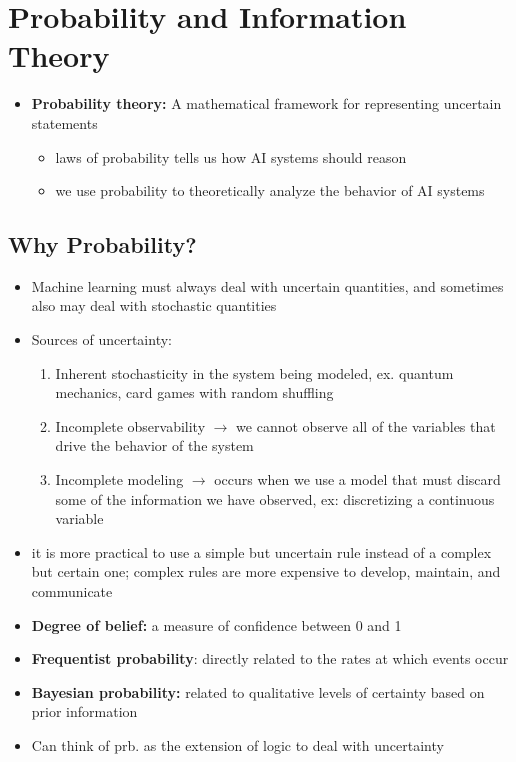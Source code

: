 \section{Probability and Information Theory}
\begin{itemize}
    \item \textbf{Probability theory:} A mathematical framework for representing uncertain statements
    \begin{itemize}
        \item laws of probability tells us how AI systems should reason
        \item we use probability to theoretically analyze the behavior of AI systems 
    \end{itemize}
\end{itemize}
\subsection{Why Probability?}
\begin{itemize}
    \item Machine learning must always deal with uncertain quantities, and sometimes also may deal with stochastic quantities
    \item Sources of uncertainty:
    \begin{enumerate}
        \item Inherent stochasticity in the system being modeled, ex. quantum mechanics, card games with random shuffling
        \item Incomplete observability $\rightarrow$ we cannot observe all of the variables that drive the behavior of the system 
        \item Incomplete modeling $\rightarrow$ occurs when we use a model that must discard some of the information we have observed, ex: discretizing a continuous variable
    \end{enumerate}
    \item it is more practical to use a simple but uncertain rule instead of a complex but certain one; complex rules are more expensive to develop, maintain, and communicate
    \item \textbf{Degree of belief:} a measure of confidence between 0 and 1
    \item \textbf{Frequentist probability}: directly related to the rates at which events occur
    \item \textbf{Bayesian probability:} related to qualitative levels of certainty based on prior information
    \item Can think of prb. as the extension of logic to deal with uncertainty
\end{itemize}


